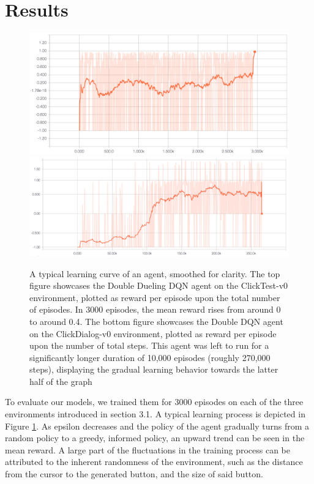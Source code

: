 \documentclass[10pt,journal,compsoc]{IEEEtran}
\begin{document}
\section{Results}

\begin{figure}[t!]
\centering
	\includegraphics[width=\columnwidth, keepaspectratio]{learningcurve.png}
	\includegraphics[width=\columnwidth, keepaspectratio]{dqnlearningcurve.png}
	\caption{A typical learning curve of an agent, smoothed for clarity. The top figure showcases the Double Dueling DQN agent on the ClickTest-v0 environment, plotted as reward per episode upon the total number of episodes. In 3000 episodes, the mean reward rises from around 0 to around 0.4. The bottom figure showcases the Double DQN agent on the ClickDialog-v0 environment, plotted as reward per episode upon the number of total steps. This agent was left to run for a significantly longer duration of 10,000 episodes (roughly 270,000 steps), displaying the gradual learning behavior towards the latter half of the graph}
	\label{fig:tboard}
\end{figure}

To evaluate our models, we trained them for 3000 episodes on each of the three environments introduced in section 3.1. A typical learning process is depicted in Figure \ref{fig:tboard}. As epsilon decreases and the policy of the agent gradually turns from a random policy to a greedy, informed policy, an upward trend can be seen in the mean reward. A large part of the fluctuations in the training process can be attributed to the inherent randomness of the environment, such as the distance from the cursor to the generated button, and the size of said button.
\end{document}
